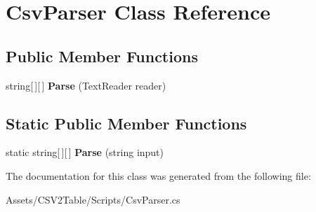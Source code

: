 \hypertarget{class_csv_parser}{}\section{Csv\+Parser Class Reference}
\label{class_csv_parser}
\subsection*{Public Member Functions}
\begin{DoxyCompactItemize}
\item 
string\mbox{[}$\,$\mbox{]}\mbox{[}$\,$\mbox{]} {\bfseries Parse} (Text\+Reader reader)\hypertarget{class_csv_parser_a8d4339138df21f81e10af5c0381899de}{}\label{class_csv_parser_a8d4339138df21f81e10af5c0381899de}

\end{DoxyCompactItemize}
\subsection*{Static Public Member Functions}
\begin{DoxyCompactItemize}
\item 
static string\mbox{[}$\,$\mbox{]}\mbox{[}$\,$\mbox{]} {\bfseries Parse} (string input)\hypertarget{class_csv_parser_a09c81705238e13b1bf319fccecb0253c}{}\label{class_csv_parser_a09c81705238e13b1bf319fccecb0253c}

\end{DoxyCompactItemize}


The documentation for this class was generated from the following file\+:\begin{DoxyCompactItemize}
\item 
Assets/\+C\+S\+V2\+Table/\+Scripts/Csv\+Parser.\+cs\end{DoxyCompactItemize}
